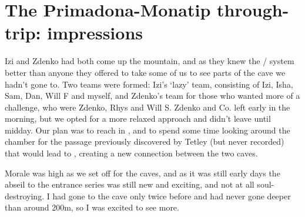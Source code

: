 \section{The Primadona-Monatip through-trip: impressions}

\begin{marginfigure}
\end{marginfigure}


Izi and Zdenko had both come up the mountain, and as they knew the / system better than anyone they offered to take some of us to see parts of the cave we hadn't gone to. Two teams were formed: Izi's `lazy' team, consisting of Izi, Isha, Sam, Dan, Will F and myself, and Zdenko's team for those who wanted more of a challenge, who were Zdenko, Rhys and Will S. Zdenko and Co. left early in the morning, but we opted for a more relaxed approach and didn't leave until midday. Our plan was to reach  in , and to spend some time looking around the chamber for the passage previously discovered by Tetley (but never recorded) that would lead to , creating a new connection between the two caves.

Morale was high as we set off for the caves, and as it was still early days the abseil to the entrance series was still new and exciting, and not at all soul-destroying. I had gone to the cave only twice before and had never gone deeper than around 200m, so I was excited to see more.


